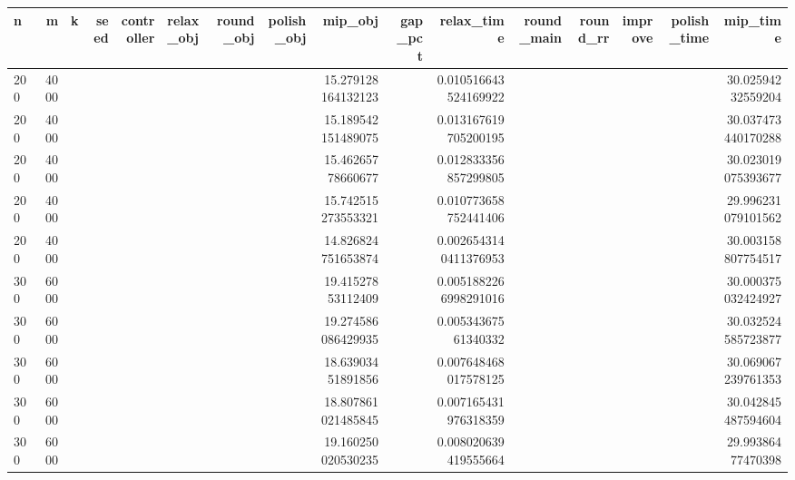 \begin{tabular}{lrrrrlrrrrrrrrrr}
\hline
n & m & k & seed & controller & relax_obj & round_obj & polish_obj & mip_obj & gap_pct & relax_time & round_main & round_rr & improve & polish_time & mip_time \\ \hline
200 & 4000 &  &  &  &  &  &  & 15.279128164132123 &  & 0.010516643524169922 &  &  &  &  & 30.02594232559204 \\
200 & 4000 &  &  &  &  &  &  & 15.189542151489075 &  & 0.013167619705200195 &  &  &  &  & 30.037473440170288 \\
200 & 4000 &  &  &  &  &  &  & 15.46265778660677 &  & 0.012833356857299805 &  &  &  &  & 30.023019075393677 \\
200 & 4000 &  &  &  &  &  &  & 15.742515273553321 &  & 0.010773658752441406 &  &  &  &  & 29.996231079101562 \\
200 & 4000 &  &  &  &  &  &  & 14.826824751653874 &  & 0.0026543140411376953 &  &  &  &  & 30.003158807754517 \\
300 & 6000 &  &  &  &  &  &  & 19.41527853112409 &  & 0.0051882266998291016 &  &  &  &  & 30.000375032424927 \\
300 & 6000 &  &  &  &  &  &  & 19.274586086429935 &  & 0.00534367561340332 &  &  &  &  & 30.032524585723877 \\
300 & 6000 &  &  &  &  &  &  & 18.63903451891856 &  & 0.007648468017578125 &  &  &  &  & 30.069067239761353 \\
300 & 6000 &  &  &  &  &  &  & 18.807861021485845 &  & 0.007165431976318359 &  &  &  &  & 30.042845487594604 \\
300 & 6000 &  &  &  &  &  &  & 19.160250020530235 &  & 0.008020639419555664 &  &  &  &  & 29.99386477470398 \\
\hline
\end{tabular}
